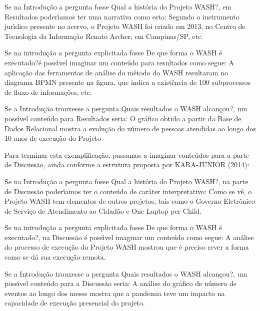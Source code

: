\documentclass[
12pt,		%
openright,	%
twoside,  %
a4paper,			%
chapter=TITLE,		%
english,			%
french,				%
spanish,			%
brazil				%
]{USPSC-classe/USPSC_RedarTex}
\begin{document}
\begin{alineas}
\item Se na Introdu\c{c}\~ao a pergunta fosse \textquotedbl Qual a hist\'oria do Projeto WASH?\textquotedbl , em Resultados poder\'{\i}amos ter uma narrativa como esta: \textquotedbl Segundo o instrumento jur\'{\i}dico presente no acervo, o Projeto WASH foi criado em 2013, no Centro de Tecnologia da Informa\c{c}\~ao Renato Archer, em Campinas/SP, etc.\textquotedbl 
\item Se na introdu\c{c}\~ao a pergunta explicitada fosse \textquotedbl De que forma o WASH \'e executado?\textquotedbl  \'e poss\'{\i}vel imaginar um conte\'udo para resultados como segue: \textquotedbl A aplica\c{c}\~ao das ferramentas de an\'alise do m\'etodo do WASH resultaram no diagrama BPMN presente na figura, que indica a exist\^encia de 100 subprocessos de fluxo de informa\c{c}\~oes, etc.\textquotedbl 
\item Se a Introdu\c{c}\~ao trouxesse a pergunta \textquotedbl Quais resultados o WASH alcan\c{c}ou?\textquotedbl , um poss\'{\i}vel conte\'udo para Resultados seria: \textquotedbl O gr\'afico obtido a partir da Base de Dados Relacional mostra a evolu\c{c}\~ao do n\'umero de pessoas atendidas ao longo dos 10 anos de execu\c{c}\~ao do Projeto\textquotedbl 
\end{alineas}

Para terminar esta exemplifica\c{c}\~ao, passamos a imaginar conte\'udos para a parte de Discuss\~ao, ainda conforme a estrutura proposta por  KARA-JUNIOR (2014):









\begin{alineas}
\item Se na Introdu\c{c}\~ao a pergunta fosse \textquotedbl Qual a hist\'oria do Projeto WASH?\textquotedbl , na parte de Discuss\~ao poder\'{\i}amos ter o conte\'udo de car\'ater interpretativo: \textquotedbl Como se v\^e, o Projeto WASH tem elementos de outros projetos, tais como o Governo Eletr\^onico de Servi\c{c}o de Atendimento ao Cidad\~ao e One Laptop per Child\textquotedbl .
\item Se na introdu\c{c}\~ao a pergunta explicitada fosse \textquotedbl De que forma o WASH \'e executado?\textquotedbl , na Discuss\~ao \'e poss\'{\i}vel imaginar um conte\'udo como segue: \textquotedbl A an\'alise do processo de execu\c{c}\~ao do Projeto WASH mostrou que \'e preciso rever a forma como se d\'a sua execu\c{c}\~ao remota\textquotedbl .
\item Se a Introdu\c{c}\~ao trouxesse a pergunta \textquotedbl Quais resultados o WASH alcan\c{c}ou?\textquotedbl , um poss\'{\i}vel conte\'udo para a Discuss\~ao seria: \textquotedbl A an\'alise do gr\'afico de n\'umero de eventos ao longo dos meses mostra que a pandemia teve um impacto na capacidade de execu\c{c}\~ao presencial do projeto.\textquotedbl 
\end{alineas}
\end{document}
